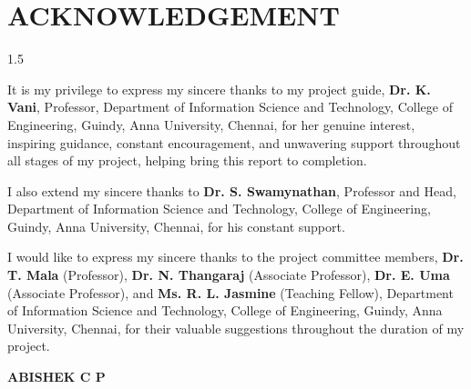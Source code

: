 \chapter*{\uppercase{ACKNOWLEDGEMENT}}
\begin{spacing}{1.5}
  \begin{sloppypar}
It is my privilege to express my sincere thanks to my project guide, \textbf{Dr. K. Vani}, Professor, Department of Information Science and Technology, College of Engineering, Guindy, Anna University, Chennai, for her genuine interest, inspiring guidance, constant encouragement, and unwavering support throughout all stages of my project, helping bring this report to completion.

I also extend my sincere thanks to \textbf{Dr. S. Swamynathan}, Professor and Head, Department of Information Science and Technology, College of Engineering, Guindy, Anna University, Chennai, for his constant support.

I would like to express my sincere thanks to the project committee members, \textbf{Dr. T. Mala} (Professor), \textbf{Dr. N. Thangaraj} (Associate Professor),  \textbf{Dr. E. Uma} (Associate Professor), and \textbf{Ms. R. L. Jasmine} (Teaching Fellow), Department of Information Science and Technology, College of Engineering, Guindy, Anna University, Chennai, for their valuable suggestions throughout the duration of my project.
  \end{sloppypar}
\end{spacing}
\begin{flushright}
\textbf{ABISHEK C P}
\end{flushright}

